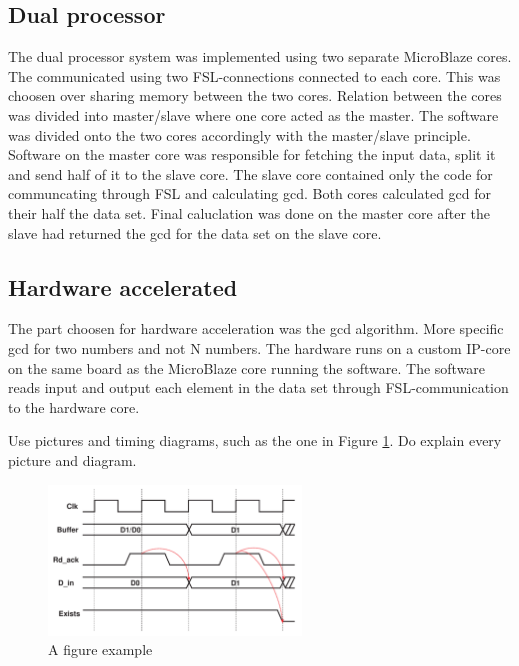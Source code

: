 \documentclass[11pt]{article}
\begin{document}
\subsection{Dual processor}
The dual processor system was implemented using two separate MicroBlaze cores. The communicated using two FSL-connections connected to each core. This was choosen over sharing memory between the two cores. Relation between the cores was divided into master/slave where one core acted as the master. The software was divided onto the two cores accordingly with the master/slave principle. Software on the master core was responsible for fetching the input data, split it and send half of it to the slave core. The slave core contained only the code for communcating through FSL and calculating gcd. Both cores calculated gcd for their half the data set. Final caluclation was done on the master core after the slave had returned the gcd for the data set on the slave core.
\subsection{Hardware accelerated}
The part choosen for hardware acceleration was the gcd algorithm. More specific gcd for two numbers and not N numbers. The hardware runs on a custom IP-core on the same board as the MicroBlaze core running the software. The software reads input and output each element in the data set through FSL-communication to the hardware core.  


Use pictures and timing diagrams, such as the one in Figure \ref{fig:example}. Do explain every picture and diagram.

\begin{figure}[!htb]
   \centering
   \includegraphics[width=0.6\textwidth]{example} 
   \caption{A figure example}
   \label{fig:example}
\end{figure}
\end{document}
